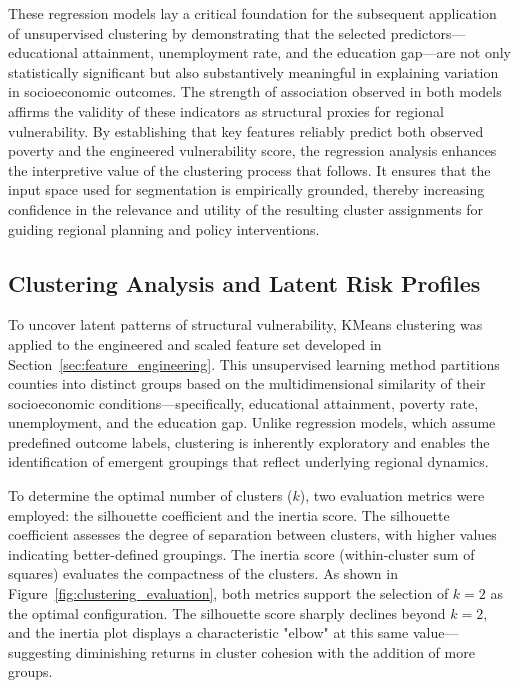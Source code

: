 \documentclass{llncs}
\begin{document}
These regression models lay a critical foundation for the subsequent application of unsupervised clustering by demonstrating that the selected predictors—educational attainment, unemployment rate, and the education gap—are not only statistically significant but also substantively meaningful in explaining variation in socioeconomic outcomes. The strength of association observed in both models affirms the validity of these indicators as structural proxies for regional vulnerability. By establishing that key features reliably predict both observed poverty and the engineered vulnerability score, the regression analysis enhances the interpretive value of the clustering process that follows. It ensures that the input space used for segmentation is empirically grounded, thereby increasing confidence in the relevance and utility of the resulting cluster assignments for guiding regional planning and policy interventions.

\subsection{Clustering Analysis and Latent Risk Profiles} \label{subsec:clustering}

To uncover latent patterns of structural vulnerability, KMeans clustering was applied to the engineered and scaled feature set developed in Section~\ref{sec:feature_engineering}. This unsupervised learning method partitions counties into distinct groups based on the multidimensional similarity of their socioeconomic conditions—specifically, educational attainment, poverty rate, unemployment, and the education gap. Unlike regression models, which assume predefined outcome labels, clustering is inherently exploratory and enables the identification of emergent groupings that reflect underlying regional dynamics.

To determine the optimal number of clusters ($k$), two evaluation metrics were employed: the silhouette coefficient and the inertia score. The silhouette coefficient assesses the degree of separation between clusters, with higher values indicating better-defined groupings. The inertia score (within-cluster sum of squares) evaluates the compactness of the clusters. As shown in Figure~\ref{fig:clustering_evaluation}, both metrics support the selection of $k=2$ as the optimal configuration. The silhouette score sharply declines beyond $k=2$, and the inertia plot displays a characteristic "elbow" at this same value—suggesting diminishing returns in cluster cohesion with the addition of more groups.
\end{document}
